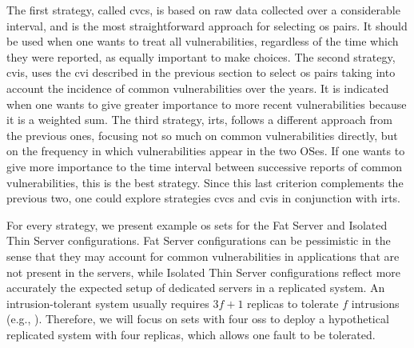 The first strategy, called \gls{cvcs}, is based on raw data collected over a considerable interval, and is the most straightforward approach for selecting \gls{os} pairs. 
It should be used when one wants to treat all vulnerabilities, regardless of the time which they were reported, as equally important to make choices. 
The second strategy, \gls{cvis}, uses the \gls{cvi} described in the previous section to select \gls{os} pairs taking into account the incidence of common vulnerabilities over the years. 
It is indicated when one wants to give greater importance to more recent vulnerabilities because it is a weighted sum. 
The third strategy, \gls{irts}, follows a different approach from the previous ones, focusing not so much on common vulnerabilities directly, but on the frequency in which vulnerabilities appear in the two OSes. If one wants to give more importance to the time interval between successive reports of common vulnerabilities, this is the best strategy. 
Since this last criterion complements the previous two, one could explore strategies \gls{cvcs} and \gls{cvis} in conjunction with \gls{irts}.

For every strategy, we present example \gls{os} sets for the Fat Server and Isolated Thin Server configurations. 
Fat Server configurations can be pessimistic in the sense that they may account for common vulnerabilities in applications that are not present in the servers, while Isolated Thin Server configurations reflect more accurately the expected setup of dedicated servers in a replicated system. 
An intrusion-tolerant system usually requires $3f+1$ replicas to tolerate $f$ intrusions (e.g., \cite{Castro:2002}). 
Therefore, we will focus on sets with four \glspl{os} to deploy a hypothetical replicated system with four replicas, which allows one fault to be tolerated.

